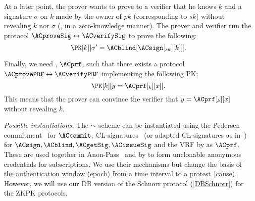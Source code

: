 At a later point, the prover wants to prove to a verifier that he knows \(k\) and a signature \(\sigma\) on \(k\) made by the owner of \(pk\) (corresponding to \(sk\)) without revealing \(k\) nor \(\sigma\) (\ie, in a zero-knowledge manner).
The prover and verifier run the protocol \(\ACproveSig\leftrightarrow \ACverifySig\) to prove the following:
\begin{equation*}
  \PK[k][\sigma' = \ACblind[\ACsign[_{sk}][k]]].
\end{equation*}


Finally, we need , \(\ACprf\), such that there exists a protocol \(\ACprovePRF\leftrightarrow \ACverifyPRF\) implementing the following 
\ac{PK}:
\begin{equation*}
  \PK[k][y = \ACprf[_k][x]].
\end{equation*}
This means that the prover can convince the verifier that \(y = \ACprf[_k][x]\) without revealing \(k\).


\emph{Possible instantiations.}
The \(\AC\) scheme can be instantiated using the Pedersen commitment~\cite{PedersenCommitment} for \(\ACcommit\),
CL-signatures~\cite{CLsignatures} (or adapted CL-signatures as in~\cite{AnonPass}) for \(\ACsign, \ACblind, \ACgetSig, \ACissueSig\) and the \ac{VRF} by \citet{DY-VRF} as \(\ACprf\).
These are used together in Anon-Pass~\cite{AnonPass} and by 
\textcite{HowToWinTheCloneWars} to form unclonable anonymous credentials for 
subscriptions.
We use their mechanisms but change the basis of the authentication window 
(epoch) from a time interval to a protest (cause).
However, we will use our \ac{DB} version of the Schnorr protocol 
(\cref{DBSchnorr}) for the \ac{ZKPK} protocols.
